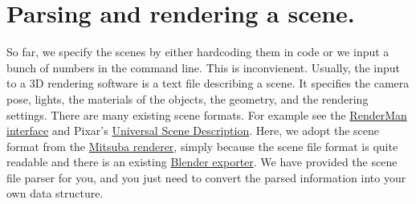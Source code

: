 \section{Parsing and rendering a scene.}
So far, we specify the scenes by either hardcoding them in code or we input a bunch of numbers in the command line. 
This is inconvienent. Usually, the input to a 3D rendering software is a text file describing a scene. It specifies the camera pose, lights, the materials of the objects, the geometry, and the rendering settings. There are many existing scene formats. For example see the \href{https://en.wikipedia.org/wiki/RenderMan_Interface_Specification}{RenderMan interface} and Pixar's \href{https://en.wikipedia.org/wiki/Universal_Scene_Description}{Universal Scene Description}. Here, we adopt the scene format from the \href{https://mitsuba.readthedocs.io/}{Mitsuba renderer}, simply because the scene file format is quite readable and there is an existing \href{https://github.com/mitsuba-renderer/mitsuba-blender}{Blender exporter}. We have provided the scene file parser for you, and you just need to convert the parsed information into your own data structure.


